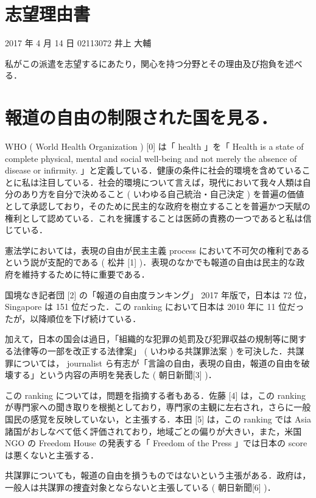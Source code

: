 \documentclass[10pt,uplatex]{jsarticle}
\begin{document}
\section*{志望理由書}

\begin{flushright}
2017 年 4 月 14 日 02113072 井上 大輔
\end{flushright}

私がこの派遣を志望するにあたり，関心を持つ分野とその理由及び抱負を述べる．

\section{報道の自由の制限された国を見る．}

WHO ( World Health Organization ) [0] は「 health 」を「 Health is a state of complete physical, mental and social well-being and not merely the absence of disease or infirmity. 」と定義している．健康の条件に社会的環境を含めていることに私は注目している．社会的環境について言えば，現代において我々人類は自分のあり方を自分で決めること ( いわゆる自己統治・自己決定 ) を普遍の価値として承認しており，そのために民主的な政府を樹立することを普遍かつ天賦の権利として認めている．これを擁護することは医師の責務の一つであると私は信じている．

憲法学においては，表現の自由が民主主義 process において不可欠の権利であるという説が支配的である ( 松井 [1] )．表現のなかでも報道の自由は民主的な政府を維持するために特に重要である．

国境なき記者団 [2] の「報道の自由度ランキング」 2017 年版で，日本は 72 位， Singapore は 151 位だった．この ranking において日本は 2010 年に 11 位だったが，以降順位を下げ続けている．

加えて，日本の国会は過日，「組織的な犯罪の処罰及び犯罪収益の規制等に関する法律等の一部を改正する法律案」 ( いわゆる共謀罪法案 ) を可決した．共謀罪については， journalist ら有志が「言論の自由，表現の自由，報道の自由を破壊する」という内容の声明を発表した ( 朝日新聞[3] )．

この ranking については，問題を指摘する者もある．佐藤 [4] は，この ranking が専門家への聞き取りを根拠としており，専門家の主観に左右され，さらに一般国民の感覚を反映していない，と主張する．本田 [5] は，この ranking では Asia 諸国がおしなべて低く評価されており，地域ごとの偏りが大きい，また，米国 NGO の Freedom House の発表する「 Freedom of the Press 」では日本の score は悪くないと主張する．

共謀罪についても，報道の自由を損うものではないという主張がある．政府は，一般人は共謀罪の捜査対象とならないと主張している ( 朝日新聞[6] )．
\end{document}
